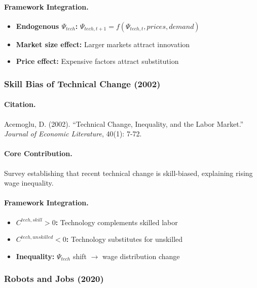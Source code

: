 \paragraph{Framework Integration.}
\begin{itemize}
  \item \textbf{Endogenous $\Psi_{tech}$:} $\Psi_{tech,t+1} = f(\Psi_{tech,t}, prices, demand)$
  \item \textbf{Market size effect:} Larger markets attract innovation
  \item \textbf{Price effect:} Expensive factors attract substitution
\end{itemize}

\subsubsection{Skill Bias of Technical Change (2002)}

\paragraph{Citation.}
Acemoglu, D. (2002). ``Technical Change, Inequality, and the Labor Market.''
\emph{Journal of Economic Literature}, 40(1): 7-72.

\paragraph{Core Contribution.}
Survey establishing that recent technical change is skill-biased,
explaining rising wage inequality.

\paragraph{Framework Integration.}
\begin{itemize}
  \item \textbf{$C^{tech,skill} > 0$:} Technology complements skilled labor
  \item \textbf{$C^{tech,unskilled} < 0$:} Technology substitutes for unskilled
  \item \textbf{Inequality:} $\Psi_{tech}$ shift $\to$ wage distribution change
\end{itemize}

\subsubsection{Robots and Jobs (2020)}

